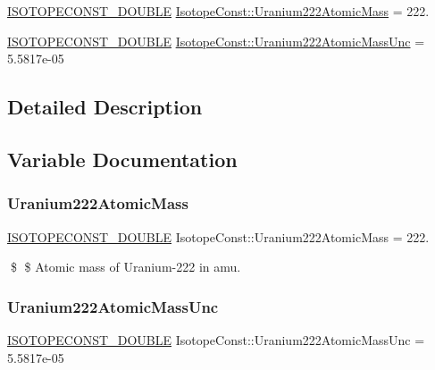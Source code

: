 \begin{DoxyCompactItemize}
\item 
\mbox{\hyperlink{group___isotope_const-_macros_ga8f45a7272ce02c0b4c65c44636ed719a}{I\+S\+O\+T\+O\+P\+E\+C\+O\+N\+S\+T\+\_\+\+D\+O\+U\+B\+LE}} \mbox{\hyperlink{group___isotope_const-_uranium-_u222_gad8c9b5feb21f30a4bdce4e377f8d15d8}{Isotope\+Const\+::\+Uranium222\+Atomic\+Mass}} = 222.
\item 
\mbox{\hyperlink{group___isotope_const-_macros_ga8f45a7272ce02c0b4c65c44636ed719a}{I\+S\+O\+T\+O\+P\+E\+C\+O\+N\+S\+T\+\_\+\+D\+O\+U\+B\+LE}} \mbox{\hyperlink{group___isotope_const-_uranium-_u222_gacca7a05ddb0b14eea3f38294b159ffc6}{Isotope\+Const\+::\+Uranium222\+Atomic\+Mass\+Unc}} = 5.\+5817e-\/05
\end{DoxyCompactItemize}


\subsection{Detailed Description}


\subsection{Variable Documentation}
\mbox{\label{group___isotope_const-_uranium-_u222_gad8c9b5feb21f30a4bdce4e377f8d15d8}} 
\subsubsection{\texorpdfstring{Uranium222\+Atomic\+Mass}{Uranium222AtomicMass}}
{\footnotesize\ttfamily \mbox{\hyperlink{group___isotope_const-_macros_ga8f45a7272ce02c0b4c65c44636ed719a}{I\+S\+O\+T\+O\+P\+E\+C\+O\+N\+S\+T\+\_\+\+D\+O\+U\+B\+LE}} Isotope\+Const\+::\+Uranium222\+Atomic\+Mass = 222.}

\$ \$ Atomic mass of Uranium-\/222 in amu. \mbox{\label{group___isotope_const-_uranium-_u222_gacca7a05ddb0b14eea3f38294b159ffc6}} 
\subsubsection{\texorpdfstring{Uranium222\+Atomic\+Mass\+Unc}{Uranium222AtomicMassUnc}}
{\footnotesize\ttfamily \mbox{\hyperlink{group___isotope_const-_macros_ga8f45a7272ce02c0b4c65c44636ed719a}{I\+S\+O\+T\+O\+P\+E\+C\+O\+N\+S\+T\+\_\+\+D\+O\+U\+B\+LE}} Isotope\+Const\+::\+Uranium222\+Atomic\+Mass\+Unc = 5.\+5817e-\/05}

